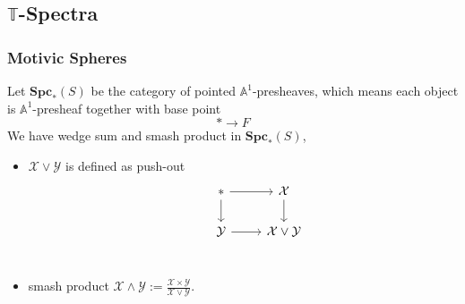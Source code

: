 \documentclass[b5paper,10pt]{article}
\begin{document}
\subsection{$\mathbb{T}$-Spectra}
\subsubsection{Motivic Spheres}
Let $\mathbf{Spc}_{*}(S)$ be the category of pointed $\mathbb{A}^1$-presheaves, which means each object is $\mathbb{A}^1$-presheaf together with base point 
\[
* \to F
\]
We have wedge sum and smash product in $\mathbf{Spc}_*(S)$,
\begin{itemize}
	\item $\mathcal{X} \vee \mathcal{Y}$ is defined as push-out
	\[
	\begin{tikzcd}
	&* \ar[r] \ar[d]& \mathcal{X} \ar[d]\\
	&\mathcal{Y} \ar[r]&\mathcal{X} \vee \mathcal{Y}\\ 
	\end{tikzcd}
	\]
	\item smash product $\mathcal{X}\wedge \mathcal{Y}:= \frac{\mathcal{X}\times \mathcal{Y}}{\mathcal{X}\vee\mathcal{Y}}$.
\end{itemize}
\end{document}
